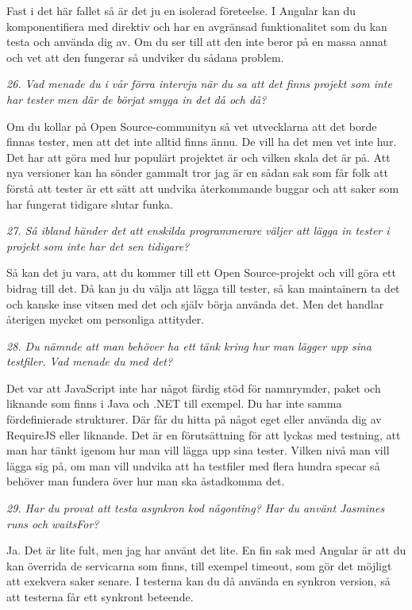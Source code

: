 \documentclass[11pt]{article}
\begin{document}
Fast i det här fallet så är det ju en isolerad företeelse. I Angular kan du komponentifiera med direktiv och har en avgränsad funktionalitet som du kan testa och använda dig av. Om du ser till att den inte beror på en massa annat och vet att den fungerar så undviker du sådana problem.

\emph{26. Vad menade du i vår förra intervju när du sa att det finns projekt som inte har tester men där de börjat smyga in det då och då?}

Om du kollar på Open Source-communityn så vet utvecklarna att det borde finnas tester, men att det inte alltid finns ännu. De vill ha det men vet inte hur. Det har att göra med hur populärt projektet är och vilken skala det är på. Att nya versioner kan ha sönder gammalt tror jag är en sådan sak som får folk att förstå att tester är ett sätt att undvika återkommande buggar och att saker som har fungerat tidigare slutar funka.

\emph{27. Så ibland händer det att enskilda programmerare väljer att lägga in tester i projekt som inte har det sen tidigare?}

Så kan det ju vara, att du kommer till ett Open Source-projekt och vill göra ett bidrag till det. Då kan ju du välja att lägga till tester, så kan maintainern ta det och kanske inse vitsen med det och själv börja använda det. Men det handlar återigen mycket om personliga attityder.

\emph{28. Du nämnde att man behöver ha ett tänk kring hur man lägger upp sina testfiler. Vad menade du med det?}

Det var att JavaScript inte har något färdig stöd för namnrymder, paket och liknande som finns i Java och .NET till exempel. Du har inte samma fördefinierade strukturer. Där får du hitta på något eget eller använda dig av RequireJS eller liknande. Det är en förutsättning för att lyckas med testning, att man har tänkt igenom hur man vill lägga upp sina tester. Vilken nivå man vill lägga sig på, om man vill undvika att ha testfiler med flera hundra specar så behöver man fundera över hur man ska åstadkomma det.

\emph{29. Har du provat att testa asynkron kod någonting? Har du använt Jasmines runs och waitsFor?}

Ja. Det är lite fult, men jag har använt det lite. En fin sak med Angular är att du kan överrida de servicarna som finns, till exempel timeout, som gör det möjligt att exekvera saker senare. I testerna kan du då använda en synkron version, så att testerna får ett synkront beteende.
\end{document}
